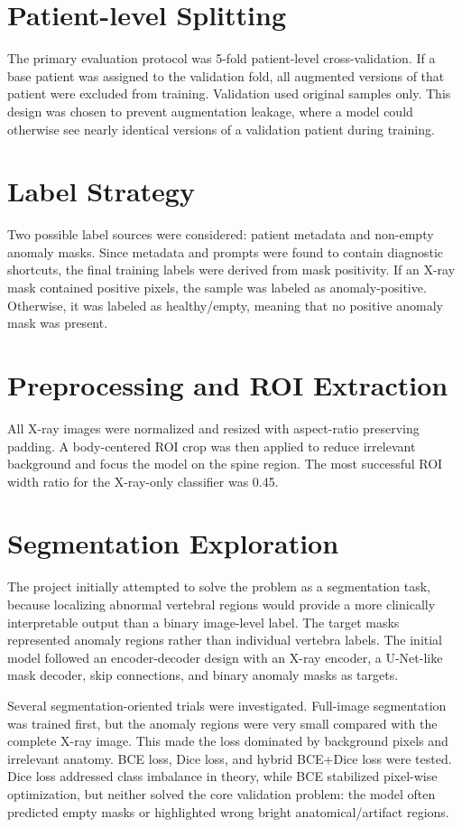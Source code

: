 \section{Patient-level Splitting}
The primary evaluation protocol was 5-fold patient-level cross-validation. If a base patient was assigned to the validation fold, all augmented versions of that patient were excluded from training. Validation used original samples only. This design was chosen to prevent augmentation leakage, where a model could otherwise see nearly identical versions of a validation patient during training.

\section{Label Strategy}
Two possible label sources were considered: patient metadata and non-empty anomaly masks. Since metadata and prompts were found to contain diagnostic shortcuts, the final training labels were derived from mask positivity. If an X-ray mask contained positive pixels, the sample was labeled as anomaly-positive. Otherwise, it was labeled as healthy/empty, meaning that no positive anomaly mask was present.

\section{Preprocessing and ROI Extraction}
All X-ray images were normalized and resized with aspect-ratio preserving padding. A body-centered ROI crop was then applied to reduce irrelevant background and focus the model on the spine region. The most successful ROI width ratio for the X-ray-only classifier was 0.45.

\section{Segmentation Exploration}
The project initially attempted to solve the problem as a segmentation task, because localizing abnormal vertebral regions would provide a more clinically interpretable output than a binary image-level label. The target masks represented anomaly regions rather than individual vertebra labels. The initial model followed an encoder-decoder design with an X-ray encoder, a U-Net-like mask decoder, skip connections, and binary anomaly masks as targets.

Several segmentation-oriented trials were investigated. Full-image segmentation was trained first, but the anomaly regions were very small compared with the complete X-ray image. This made the loss dominated by background pixels and irrelevant anatomy. BCE loss, Dice loss, and hybrid BCE+Dice loss were tested. Dice loss addressed class imbalance in theory, while BCE stabilized pixel-wise optimization, but neither solved the core validation problem: the model often predicted empty masks or highlighted wrong bright anatomical/artifact regions.

